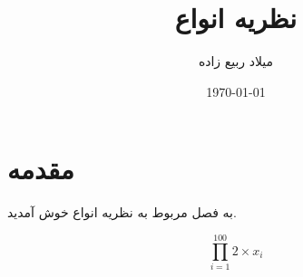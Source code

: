 \documentclass[12pt]{report}
\title{نظریه انواع}
\author{میلاد ربیع زاده}
\date{\today}
\begin{document}
\pagestyle{plain}
\setcounter{page}{1}

\maketitle

\tableofcontents

\newpage


\chapter{مقدمه}


به فصل مربوط به نظریه انواع خوش آمدید.

$$\prod_{i = 1}^{100} 2 \times x_i$$
\end{document}
